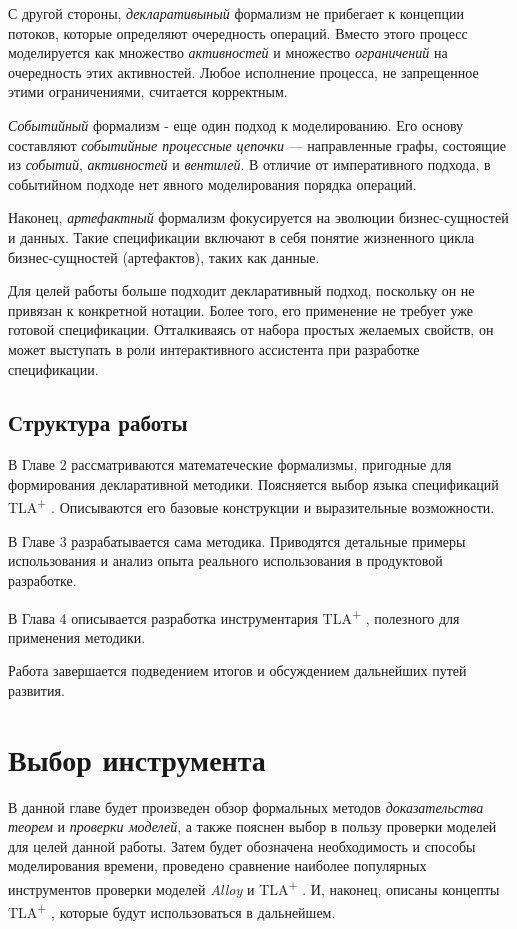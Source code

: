 \documentclass[14pt, openany]{book}
\newcommand{\tlapl}{TLA\textsuperscript{+} }
\begin{document}
С другой стороны, \emph{декларативыный} формализм не прибегает к концепции потоков, которые определяют очередность операций. Вместо этого процесс моделируется как множество \emph{активностей} и множество \emph{ограничений} на очередность этих активностей. Любое исполнение процесса, не запрещенное этими ограничениями, считается корректным.

\emph{Событийный} формализм \cite{specEDC} - еще один подход к моделированию. Его основу составляют \emph{событийные процессные цепочки} --- направленные графы, состоящие из \emph{событий}, \emph{активностей} и \emph{вентилей}. В отличие от императивного подхода, в событийном подходе нет явного моделирования порядка операций.

Наконец, \emph{артефактный} формализм фокусируется на эволюции бизнес-сущностей и данных. Такие спецификации включают в себя понятие жизненного цикла бизнес-сущностей (артефактов), таких как данные.

Для целей работы больше подходит декларативный подход, поскольку он не привязан к конкретной нотации. Более того, его применение не требует уже готовой спецификации. Отталкиваясь от набора простых желаемых свойств, он может выступать в роли интерактивного ассистента при разработке спецификации.


\section{Структура работы}

В Главе 2 рассматриваются математеческие формализмы, пригодные для формирования декларативной методики. Поясняется выбор языка спецификаций \tlapl. Описываются его базовые конструкции и выразительные возможности.

В Главе 3 разрабатывается сама методика. Приводятся детальные примеры использования и анализ опыта реального использования в продуктовой разработке. 

В Глава 4 описывается разработка инструментария \tlapl, полезного для применения методики.

Работа завершается подведением итогов и обсуждением дальнейших путей развития.

\chapter{Выбор инструмента}
В данной главе будет произведен обзор формальных методов \emph{доказательства теорем} и \emph{проверки моделей}, а также пояснен выбор в пользу проверки моделей для целей данной работы. Затем будет обозначена необходимость и способы моделирования времени, проведено сравнение наиболее популярных инструментов проверки моделей \emph{Alloy} и \tlapl. И, наконец, описаны концепты \tlapl, которые будут использоваться в дальнейшем.
\end{document}
